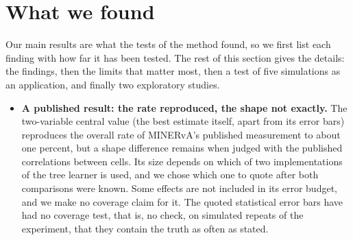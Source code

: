 \section{What we found}

Our main results are what the tests of the method found, so we first list each finding with how far it has been tested. The rest of this section gives the details: the findings, then the limits that matter most, then a test of five simulations as an application, and finally two exploratory studies.
\begin{itemize}
\item \textbf{A published result: the rate reproduced, the shape not exactly.} The two-variable central value (the best estimate itself, apart from its error bars) reproduces the overall rate of MINERvA's published measurement to about one percent, but a shape difference remains when judged with the published correlations between cells. Its size depends on which of two implementations of the tree learner is used, and we chose which one to quote after both comparisons were known. Some effects are not included in its error budget, and we make no coverage claim for it. The quoted statistical error bars have had no coverage test, that is, no check, on simulated repeats of the experiment, that they contain the truth as often as stated.

\end{itemize}
